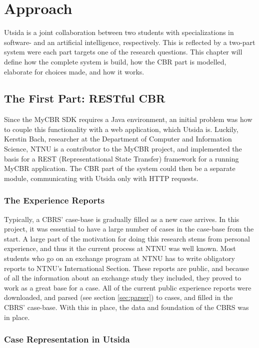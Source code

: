 
\chapter{Approach}

Utsida is a joint collaboration between two students with specializations in software- and an artificial intelligence, respectively. This is reflected by a two-part system were each part targets one of the research questions. This chapter will define how the complete system is build, how the CBR part is modelled, elaborate for choices made, and how it works.

\section{The First Part: RESTful CBR}
Since the MyCBR SDK requires a Java environment, an initial problem was how to couple this functionality with a web application, which Utsida is. Luckily, Kerstin Bach, researcher at the Department of Computer and Information Science, NTNU is a contributor to the MyCBR project, and implemented the basis for a REST (Representational State Transfer) framework for a running MyCBR application. The CBR part of the system could then be a separate module, communicating with Utsida only with HTTP requests.



\subsection{The Experience Reports}\label{sec:experience_reports}
Typically, a CBRS' case-base is gradually filled as a new case arrives. In this project, it was essential to have a large number of cases in the case-base from the start. A large part of the motivation for doing this research stems from personal experience, and thus it the current process at NTNU was well known. Most students who go on an exchange program at NTNU has to write obligatory reports to NTNU's International Section. These reports are public, and because of all the information about an exchange study they included, they proved to work as a great base for a case. All of the current public experience reports were downloaded, and parsed (see section \ref{sec:parser}) to cases, and filled in the CBRS' case-base. With this in place, the data and foundation of the CBRS was in place.


\subsection{Case Representation in Utsida}

